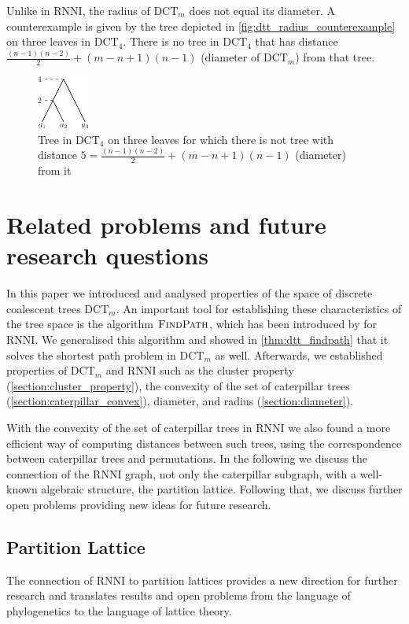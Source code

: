 \documentclass[11pt]{amsart}
\newcommand{\rnni}{\mathrm{RNNI}}
\newcommand{\findpath}{\textsc{FindPath}}
\newcommand{\dtt}{\mathrm{DCT}}
\begin{document}
Unlike in $\rnni$, the radius of $\dtt_m$ does not equal its diameter.
A counterexample is given by the tree depicted in \autoref{fig:dtt_radius_counterexample} on three leaves in $\dtt_4$.
There is no tree in $\dtt_4$ that has distance $\frac{(n-1)(n-2)}{2} + (m-n+1)(n-1)$ (diameter of $\dtt_m$) from that tree.

\begin{figure}[ht]
	\includegraphics[width=0.15\textwidth]{dtt_radius_counterexample.eps}
	\caption{Tree in $\dtt_4$ on three leaves for which there is not tree with distance $5 = \frac{(n-1)(n-2)}{2} + (m-n+1)(n-1)$ (diameter) from it}
	\label{fig:dtt_radius_counterexample}
\end{figure}


\section{Related problems and future research questions}
\label{section:open_problems}

In this paper we introduced and analysed properties of the space of discrete coalescent trees $\dtt_m$.
An important tool for establishing these characteristics of the tree space is the algorithm $\findpath$, which has been introduced by \textcite{Collienne2020-iu} for $\rnni$.
We generalised this algorithm and showed in \autoref{thm:dtt_findpath} that it solves the shortest path problem in $\dtt_m$ as well.
Afterwards, we established properties of $\dtt_m$ and $\rnni$ such as the cluster property (\autoref{section:cluster_property}), the convexity of the set of caterpillar trees (\autoref{section:caterpillar_convex}), diameter, and radius (\autoref{section:diameter}).

With the convexity of the set of caterpillar trees in $\rnni$ we also found a more efficient way of computing distances between such trees, using the correspondence between caterpillar trees and permutations.
In the following we discuss the connection of the $\rnni$ graph, not only the caterpillar subgraph, with a well-known algebraic structure, the partition lattice.
Following that, we discuss further open problems providing new ideas for future research.

\subsection{Partition Lattice}
The connection of $\rnni$ to partition lattices provides a new direction for further research and translates results and open problems from the language of phylogenetics to the language of lattice theory.
\end{document}
